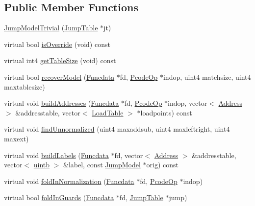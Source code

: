 \subsection*{Public Member Functions}
\begin{DoxyCompactItemize}
\item 
\mbox{\hyperlink{class_jump_model_trivial_a23f15dcccc30e8496c1c2e983bcfa20b}{Jump\+Model\+Trivial}} (\mbox{\hyperlink{class_jump_table}{Jump\+Table}} $\ast$jt)
\item 
virtual bool \mbox{\hyperlink{class_jump_model_trivial_a30aedefb694d84c374a6dff13002cae7}{is\+Override}} (void) const
\item 
virtual int4 \mbox{\hyperlink{class_jump_model_trivial_a850ec9c73e9acc78465d896008b265fe}{get\+Table\+Size}} (void) const
\item 
virtual bool \mbox{\hyperlink{class_jump_model_trivial_ae05a183588550bc9102e12c80d7124b5}{recover\+Model}} (\mbox{\hyperlink{class_funcdata}{Funcdata}} $\ast$fd, \mbox{\hyperlink{class_pcode_op}{Pcode\+Op}} $\ast$indop, uint4 matchsize, uint4 maxtablesize)
\item 
virtual void \mbox{\hyperlink{class_jump_model_trivial_a598ff420975134b8921c4a5ade192e0f}{build\+Addresses}} (\mbox{\hyperlink{class_funcdata}{Funcdata}} $\ast$fd, \mbox{\hyperlink{class_pcode_op}{Pcode\+Op}} $\ast$indop, vector$<$ \mbox{\hyperlink{class_address}{Address}} $>$ \&addresstable, vector$<$ \mbox{\hyperlink{class_load_table}{Load\+Table}} $>$ $\ast$loadpoints) const
\item 
virtual void \mbox{\hyperlink{class_jump_model_trivial_a76017216abd7b4389f42e331d025d9dc}{find\+Unnormalized}} (uint4 maxaddsub, uint4 maxleftright, uint4 maxext)
\item 
virtual void \mbox{\hyperlink{class_jump_model_trivial_a2f156e909104f7a992e61a288e207c08}{build\+Labels}} (\mbox{\hyperlink{class_funcdata}{Funcdata}} $\ast$fd, vector$<$ \mbox{\hyperlink{class_address}{Address}} $>$ \&addresstable, vector$<$ \mbox{\hyperlink{types_8h_a2db313c5d32a12b01d26ac9b3bca178f}{uintb}} $>$ \&label, const \mbox{\hyperlink{class_jump_model}{Jump\+Model}} $\ast$orig) const
\item 
virtual void \mbox{\hyperlink{class_jump_model_trivial_a942b0f44fb8ff1fc692914cc26894cc1}{fold\+In\+Normalization}} (\mbox{\hyperlink{class_funcdata}{Funcdata}} $\ast$fd, \mbox{\hyperlink{class_pcode_op}{Pcode\+Op}} $\ast$indop)
\item 
virtual bool \mbox{\hyperlink{class_jump_model_trivial_a063b80b921795c341598e643f5ee7cce}{fold\+In\+Guards}} (\mbox{\hyperlink{class_funcdata}{Funcdata}} $\ast$fd, \mbox{\hyperlink{class_jump_table}{Jump\+Table}} $\ast$jump)

\end{DoxyCompactItemize}
